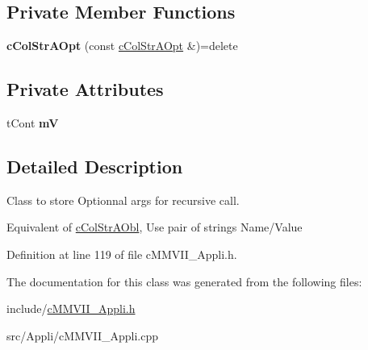 \subsection*{Private Member Functions}
\begin{DoxyCompactItemize}
\item 
{\bfseries c\+Col\+Str\+A\+Opt} (const \hyperlink{classMMVII_1_1cColStrAOpt}{c\+Col\+Str\+A\+Opt} \&)=delete\hypertarget{classMMVII_1_1cColStrAOpt_afd7e35a357c3c24253c017ae4f44cc8a}{}\label{classMMVII_1_1cColStrAOpt_afd7e35a357c3c24253c017ae4f44cc8a}

\end{DoxyCompactItemize}
\subsection*{Private Attributes}
\begin{DoxyCompactItemize}
\item 
t\+Cont {\bfseries mV}\hypertarget{classMMVII_1_1cColStrAOpt_a8684546d39aba2f7477c34154210ff78}{}\label{classMMVII_1_1cColStrAOpt_a8684546d39aba2f7477c34154210ff78}

\end{DoxyCompactItemize}


\subsection{Detailed Description}
Class to store Optionnal args for recursive call. 

Equivalent of \hyperlink{classMMVII_1_1cColStrAObl}{c\+Col\+Str\+A\+Obl}, Use pair of strings Name/\+Value 

Definition at line 119 of file c\+M\+M\+V\+I\+I\+\_\+\+Appli.\+h.



The documentation for this class was generated from the following files\+:\begin{DoxyCompactItemize}
\item 
include/\hyperlink{cMMVII__Appli_8h}{c\+M\+M\+V\+I\+I\+\_\+\+Appli.\+h}\item 
src/\+Appli/c\+M\+M\+V\+I\+I\+\_\+\+Appli.\+cpp\end{DoxyCompactItemize}
